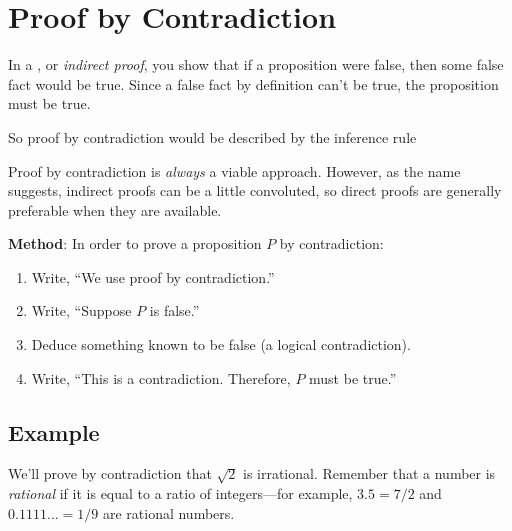 \begin{problems}

\classproblems
{}

\end{problems}

\section{Proof by Contradiction}\label{contradiction_sec}

In a , or \emph{indirect proof},%
you show that if a proposition were false, then some false fact would be true.
Since a false fact by definition can't be true, the proposition must
be true.

\begin{editingnotes}
So proof by contradiction would be described by the inference rule
\begin{rul*}
\end{rul*}

\end{editingnotes}

Proof by contradiction is \emph{always} a viable approach.  However,
as the name suggests, indirect proofs can be a little convoluted, so
direct proofs are generally preferable when they are available.

\textbf{Method}: In order to prove a proposition $P$ by contradiction:

\begin{enumerate}

\item Write, ``We use proof by contradiction.''

\item Write, ``Suppose $P$ is false.''

\item Deduce something known to be false (a logical contradiction).

\item Write, ``This is a contradiction.  Therefore, $P$ must be
true.''

\end{enumerate}

\subsection*{Example}
We'll prove by contradiction that $\sqrt{2}$ is irrational. 
Remember that a number is \emph{rational} if it is equal to a ratio
of integers---for example, $3.5 = 7/2$ and $0.1111\dots = 1/9$ are
rational numbers.

